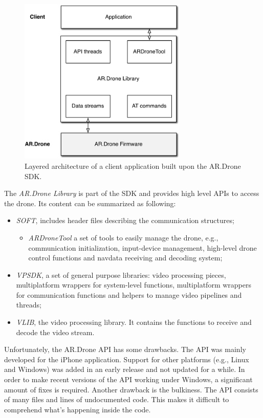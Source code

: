 \begin{figure}[htb]
\centering
\includegraphics[height=8cm]{images/platform_ardroneapi.pdf}
\caption{Layered architecture of a client application built upon the AR.Drone SDK.}
\label{fig:platform-ardroneapi}
\end{figure}

The \textit{AR.Drone Library} is part of the SDK and provides high level APIs to access the drone.
Its content can be summarized as following:
\begin{itemize}
\item \textit{SOFT}, includes header files describing the communication structures;
	\begin{itemize}
		\item \textit{ARDroneTool} a set of tools to easily manage the drone, e.g., communication initialization, input-device management, high-level drone control functions and navdata receiving and decoding system;
	\end{itemize}
\item \textit{VPSDK}, a set of general purpose libraries: video processing pieces, multiplatform wrappers for system-level functions, multiplatform wrappers for communication functions and helpers to manage video pipelines and threads;
\item \textit{VLIB}, the video processing library. It contains the functions to receive and decode the video stream.
\end{itemize}

Unfortunately, the AR.Drone API has some drawbacks.
The API was mainly developed for the iPhone application.
Support for other platforms (e.g., Linux and Windows) was added in an early release and not updated for a while.
In order to make recent versions of the API working under Windows, a significant amount of fixes is required.
Another drawback is the bulkiness.
The API consists of many files and lines of undocumented code.
This makes it difficult to comprehend what's happening inside the code.

